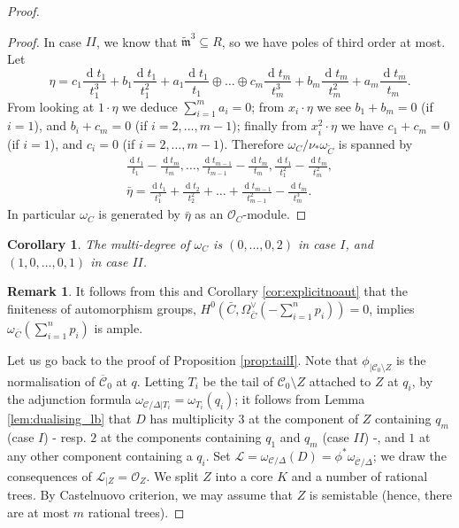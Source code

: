 \documentclass[11pt]{amsart}
\newcommand{\tm}{\widetilde{\mathfrak m}}
\newcommand{\OO}{\mathcal O}
\newcommand{\dvr}{\Delta}
\theoremstyle{plain}
\newtheorem{cor}[thm]{Corollary}
\theoremstyle{definition}
\newtheorem{rem}[thm]{Remark}
\begin{document}
\begin{proof}
\begin{proof}
In case $I\!I$, we know that $\tm^3\subseteq R$, so we have poles of third order at most. Let \[\eta=c_1\frac{\operatorname{d}t_1}{t_1^3}+b_1\frac{\operatorname{d}t_1}{t_1^2}+a_1\frac{\operatorname{d}t_1}{t_1}\oplus\ldots\oplus c_m\frac{\operatorname{d}t_m}{t_m^3}+b_m\frac{\operatorname{d}t_m}{t_m^2}+a_m\frac{\operatorname{d}t_m}{t_m}.\]
 From looking at $1\cdot\eta$ we deduce $\sum_{i=1}^m a_i=0$; from $x_i\cdot\eta$ we see $b_1+b_m=0$ (if $i=1$), and $b_i+c_m=0$ (if $i=2,\ldots,m-1$); finally from $x_i^2\cdot\eta$ we have $c_1+c_m=0$ (if $i=1$), and $c_i=0$ (if $i=2,\ldots,m-1$). Therefore $\omega_C/\nu_*\omega_{\tilde C}$ is spanned by
 \begin{align*}
  \frac{\operatorname{d}t_1}{t_1}-\frac{\operatorname{d}t_m}{t_m},\ldots,\frac{\operatorname{d}t_{m-1}}{t_{m-1}}-\frac{\operatorname{d}t_m}{t_m},\frac{\operatorname{d}t_1}{t_1^2}-\frac{\operatorname{d}t_m}{t_m^2},\\
  \bar{\eta}=\frac{\operatorname{d}t_1}{t_1^3}+\frac{\operatorname{d}t_2}{t_2^2}+\ldots+\frac{\operatorname{d}t_{m-1}}{t_{m-1}^2}-\frac{\operatorname{d}t_m}{t_m^3}.
 \end{align*}
In particular $\omega_C$ is generated by $\bar{\eta}$ as an $\OO_C$-module.

\end{proof}

\begin{cor}\label{cor:deg_dualising}
 The multi-degree of $\omega_C$ is $(0,\ldots,0,2)$ in case $I$, and $(1,0,\ldots,0,1)$ in case $I\!I$.
\end{cor}

\begin{rem}
 It follows from this and Corollary \ref{cor:explicitnoaut} that the finiteness of automorphism groups, $H^0(\bar C,\Omega_{\bar C}^\vee(-\sum_{i=1}^np_i))=0$, implies $\omega_{\bar C}(\sum_{i=1}^np_i)$ is ample.
\end{rem}
Let us go back to the proof of Proposition \ref{prop:tailI}. Note that $\phi_{|\mathcal C_0\setminus Z}$ is the normalisation of $\overline{\mathcal C}_0$ at $q$. Letting $T_i$ be the tail of $\mathcal C_0\setminus Z$ attached to $Z$ at $q_i$, by the adjunction formula $\omega_{\mathcal C/\dvr|T_i}=\omega_{T_i}(q_i)$; it follows from Lemma \ref{lem:dualising_lb} that $D$ has multiplicity $3$ at the component of $Z$ containing $q_m$ (case $I$) - resp. $2$ at the components containing $q_1$ and $q_m$ (case $I\!I$) -, and $1$ at any other component containing a $q_i$. Set $\mathcal L=\omega_{\mathcal C/\dvr}(D)=\phi^*\omega_{\overline{\mathcal C}/\dvr}$; we draw the consequences of $\mathcal L_{|Z}=\OO_Z$. We split $Z$ into a core $K$ and a number of rational trees. By Castelnuovo criterion, we may assume that $Z$ is semistable (hence, there are at most $m$ rational trees).


\end{proof}
\end{document}
